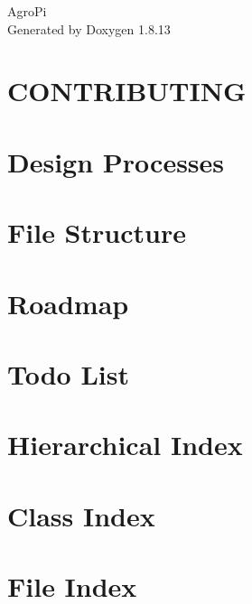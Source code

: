 \documentclass[twoside]{book}
\newcommand{\+}{\discretionary{\mbox{\scriptsize$\hookleftarrow$}}{}{}}
\newcommand{\clearemptydoublepage}{%
  \newpage{\pagestyle{empty}\cleardoublepage}%
}
\begin{document}
\hypersetup{pageanchor=false,
             bookmarksnumbered=true,
             pdfencoding=unicode
            }
\begin{titlepage}
\vspace*{7cm}
\begin{center}%
{\Large Agro\+Pi }\\
\vspace*{1cm}
{\large Generated by Doxygen 1.8.13}\\
\end{center}
\end{titlepage}
\clearemptydoublepage
{}
\tableofcontents
\clearemptydoublepage
{}
\hypersetup{pageanchor=true}

\chapter{C\+O\+N\+T\+R\+I\+B\+U\+T\+I\+NG}
\label{md_docs_CONTRIBUTING}

\chapter{Design Processes}
\label{autotoc_md1}

\chapter{File Structure}
\label{autotoc_md29}

\chapter{Roadmap}
\label{autotoc_md30}

\chapter{Todo List}
\label{todo}

\chapter{Hierarchical Index}

\chapter{Class Index}

\chapter{File Index}

\end{document}
